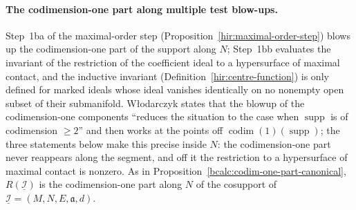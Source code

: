 \paragraph{The codimension-one part along multiple test blow-ups.} Step~1ba of the maximal-order step (Proposition~\ref{hir:maximal-order-step}) blows up the
codimension-one part of the support along \(N\); Step~1bb evaluates the invariant of the restriction of the coefficient ideal to a hypersurface of maximal
contact, and the inductive invariant (Definition~\ref{hir:centre-function}) is only defined for marked ideals whose ideal vanishes identically on no nonempty
open subset of their submanifold. Włodarczyk states that the blowup of the codimension-one components ``reduces the situation to the case when
\(\operatorname{supp}\) is of codimension \(\ge2\)'' and then works at the points off \(\operatorname{codim}(1)(\operatorname{supp})\); the three statements below make
this precise inside \(N\): the codimension-one part never reappears along the segment, and off it the restriction to a hypersurface of maximal contact is
nonzero. As in Proposition~\ref{bcalc:codim-one-part-canonical}, \(R(\underline{\mathcal I})\) is the codimension-one part along \(N\) of the cosupport of
\(\underline{\mathcal I}=(M,N,E,\mathfrak a,d)\).

